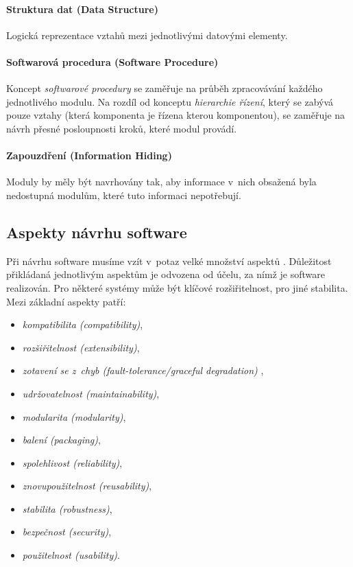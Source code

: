 \paragraph{Struktura dat (Data Structure)} Logická reprezentace vztahů mezi jednotlivými datovými elementy.

\paragraph{Softwarová procedura (Software Procedure)} Koncept \emph{softwarové procedury} se zaměřuje na průběh zpracovávání každého jednotlivého modulu. Na rozdíl od konceptu \emph{hierarchie řízení}, který se zabývá pouze vztahy (která komponenta je řízena kterou komponentou), se zaměřuje na návrh přesné posloupnosti kroků, které modul provádí.

\paragraph{Zapouzdření (Information Hiding)} Moduly by měly být navrhovány tak, aby informace v~nich obsažená byla nedostupná modulům, které tuto informaci nepotřebují.

\subsection{Aspekty návrhu software}
\label{analysis-sw_design_aspects}
Při návrhu software musíme vzít v~potaz velké množství aspektů \cite{wiki:software_design}. Důležitost přikládaná jednotlivým aspektům je odvozena od účelu, za nímž je software realizován. Pro některé systémy může být klíčové rozšiřitelnost, pro jiné stabilita. Mezi základní aspekty patří:

\begin{itemize}
\item \emph{kompatibilita (compatibility)},
\item \emph{rozšiřitelnost (extensibility)},
\item \emph{zotavení se z~chyb (fault-tolerance/graceful degradation)} \cite{wiki:fault-tolerance},
\item \emph{udržovatelnost (maintainability)},
\item \emph{modularita (modularity)},
\item \emph{balení (packaging)},
\item \emph{spolehlivost (reliability)},
\item \emph{znovupoužitelnost (reusability)},
\item \emph{stabilita (robustness)},
\item \emph{bezpečnost (security)},
\item \emph{použitelnost (usability)}.
\end{itemize}

